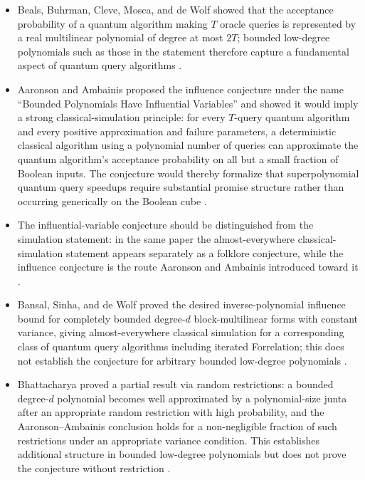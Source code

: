\begin{itemize}
  \item Beals, Buhrman, Cleve, Mosca, and de Wolf showed that the acceptance
probability of a quantum algorithm making $T$ oracle queries is represented
by a real multilinear polynomial of degree at most $2T$; bounded low-degree
polynomials such as those in the statement therefore capture a fundamental
aspect of quantum query algorithms
.

  \item Aaronson and Ambainis proposed the influence conjecture under the name
``Bounded Polynomials Have Influential Variables'' and showed it would imply
a strong classical-simulation principle: for every $T$-query quantum
algorithm and every positive approximation and failure parameters, a
deterministic classical algorithm using a polynomial number of queries can
approximate the quantum algorithm's acceptance probability on all but a
small fraction of Boolean inputs.  The conjecture would thereby formalize
that superpolynomial quantum query speedups require substantial promise
structure rather than occurring generically on the Boolean cube
.

  \item The influential-variable conjecture should be distinguished from the
simulation statement: in the same paper the almost-everywhere
classical-simulation statement appears separately as a folklore conjecture,
while the influence conjecture is the route Aaronson and Ambainis introduced
toward it
.

  \item Bansal, Sinha, and de Wolf proved the desired inverse-polynomial influence
bound for completely bounded degree-$d$ block-multilinear forms with
constant variance, giving almost-everywhere classical simulation for a
corresponding class of quantum query algorithms including iterated
Forrelation; this does not establish the conjecture for arbitrary bounded
low-degree polynomials
.

  \item Bhattacharya proved a partial result via random restrictions: a bounded
degree-$d$ polynomial becomes well approximated by a polynomial-size junta
after an appropriate random restriction with high probability, and the
Aaronson--Ambainis conclusion holds for a non-negligible fraction of such
restrictions under an appropriate variance condition.  This establishes
additional structure in bounded low-degree polynomials but does not prove
the conjecture without restriction
.


\end{itemize}
